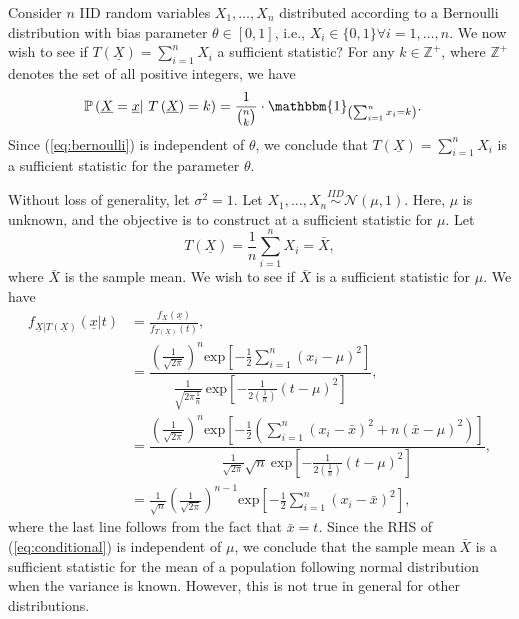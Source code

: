 \documentclass[a4paper,english,12pt]{article}
\begin{document}
\begin{exmp}
	Consider $ n $ IID random variables $ X_1, \dots, X_n $ distributed according to a Bernoulli distribution with bias parameter $ \theta \in \left[0,1\right]$, i.e., $ X_i \in \{0,1\} \forall i=1,\ldots,n $. We now wish to see if $ T\left(\underline{X}\right) = \sum\limits_{i=1}^{n} X_i$ a sufficient statistic? For any $ k\in \mathbb{Z}^{+} $, where $ \mathbb{Z}^{+} $ denotes the set of all positive integers, we have
	\begin{align}
	\mathbb{P}\left(\underline{X} = \underline{x} \vert ~ T\left(\underline{X}\right) = k \right) &= \frac{1}{ \binom{n}{k}} \cdot \mathbbm{1}_{\left( \sum_{i=1}^{n} x_i = k \right)} .\label{eq:bernoulli}
	\end{align}     
	Since (\ref*{eq:bernoulli}) is independent of $ \theta $, we conclude that $ T\left(\underline{X}\right) = \sum\limits_{i=1}^{n} X_i $ is a sufficient statistic for the parameter $ \theta $. 
\end{exmp}
\begin{exmp}
	Without loss of generality, let $ \sigma^{2}=1 $. Let $ X_{1},\ldots,X_{n} \stackrel{IID}{\sim} \mathcal{N}(\mu,1) $. Here, $ \mu $ is unknown, and the objective is to construct at a sufficient statistic for $ \mu $. Let
	\begin{equation}
	T(\underline{X})=\frac{1}{n}\sum\limits_{i=1}^{n}X_{i} = \bar{X}\label{eq:T(X)},
	\end{equation}
	where $ \bar{X} $ is the sample mean. We wish to see if $ \bar{X} $ is a sufficient statistic for $ \mu $. We have
	\begin{align}
		f_{\underline{X}|T(\underline{X})}(\underline{x}|t)&=\frac{f_{\underline{X}}(\underline{x})}{f_{T(\underline{X})}(t)},\nonumber\\
		&=\dfrac{\left(\frac{1}{\sqrt{2\pi}}\right)^{n} \text{exp}\left[-\frac{1}{2}\sum\limits_{i=1}^{n}\left(x_{i}-\mu\right)^{2}\right]}{\frac{1}{\sqrt{2\pi \frac{1}{{n}}}} ~ \text{exp}\left[-\frac{1}{2\left(\frac{1}{n}\right)} \left(t-\mu\right)^{2}\right]},\nonumber\\
		&=\dfrac{\left(\frac{1}{\sqrt{2\pi}}\right)^{n} \text{exp}\left[-\frac{1}{2}\left(\sum\limits_{i=1}^{n}\left(x_{i}-\bar{x}\right)^{2}+n\left(\bar{x}-\mu\right)^{2}\right)\right]}{\frac{1}{\sqrt{2\pi}} {\sqrt{n}}~ \text{exp}\left[-\frac{1}{2\left(\frac{1}{n}\right)} \left(t-\mu\right)^{2}\right]},\nonumber\\
		&=\frac{1}{\sqrt{n}} \left(\frac{1}{\sqrt{2\pi}}\right)^{n-1} \text{exp}\left[-\frac{1}{2}\sum\limits_{i=1}^{n}\left(x_{i}-\bar{x}\right)^{2}\right],\label{eq:conditional}
		\end{align}
		where the last line follows from the fact that $ \bar{x}=t $. Since the RHS of (\ref*{eq:conditional}) is independent of $ \mu $, we conclude that the sample mean $ \bar{X} $ is a sufficient statistic for the mean of a population following normal distribution when the variance is known. However, this is not true in general for other distributions.
\end{exmp}
\end{document}
